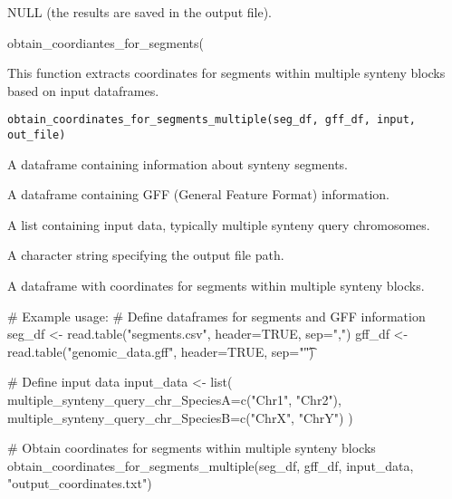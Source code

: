\documentclass[a4paper]{book}
\begin{document}
%
\begin{Value}
NULL (the results are saved in the output file).
\end{Value}
%
\begin{Examples}
\begin{ExampleCode}
obtain_coordiantes_for_segments(
\end{ExampleCode}
\end{Examples}
%
\begin{Description}\relax
This function extracts coordinates for segments within multiple synteny blocks based on input dataframes.
\end{Description}
%
\begin{Usage}
\begin{verbatim}
obtain_coordinates_for_segments_multiple(seg_df, gff_df, input, out_file)
\end{verbatim}
\end{Usage}
%
\begin{Arguments}
\begin{ldescription}
\item[\code{seg\_df}] A dataframe containing information about synteny segments.

\item[\code{gff\_df}] A dataframe containing GFF (General Feature Format) information.

\item[\code{input}] A list containing input data, typically multiple synteny query chromosomes.

\item[\code{out\_file}] A character string specifying the output file path.
\end{ldescription}
\end{Arguments}
%
\begin{Value}
A dataframe with coordinates for segments within multiple synteny blocks.
\end{Value}
%
\begin{Examples}
\begin{ExampleCode}
# Example usage:
# Define dataframes for segments and GFF information
seg_df <- read.table("segments.csv", header=TRUE, sep=",")
gff_df <- read.table("genomic_data.gff", header=TRUE, sep="\t")

# Define input data
input_data <- list(
    multiple_synteny_query_chr_SpeciesA=c("Chr1", "Chr2"),
    multiple_synteny_query_chr_SpeciesB=c("ChrX", "ChrY")
)

# Obtain coordinates for segments within multiple synteny blocks
obtain_coordinates_for_segments_multiple(seg_df, gff_df, input_data, "output_coordinates.txt")

\end{ExampleCode}
\end{Examples}
\end{document}
